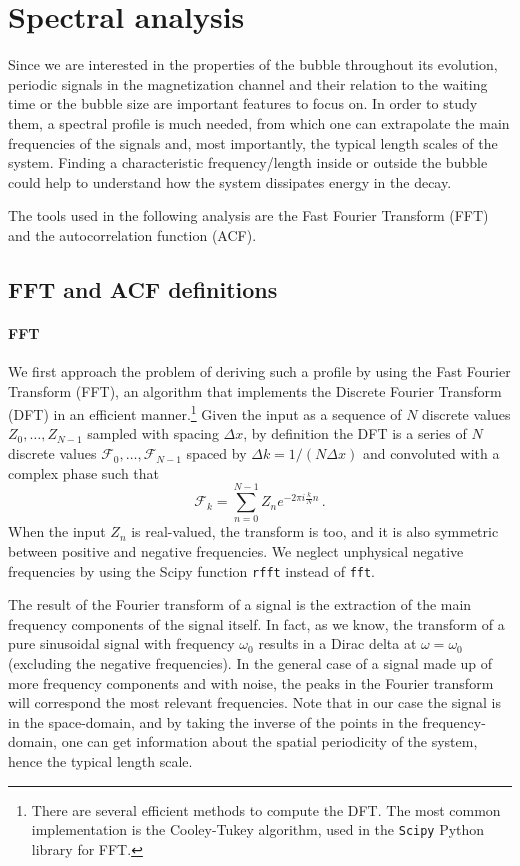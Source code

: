\section{Spectral analysis}
Since we are interested in the properties of the bubble throughout its evolution, periodic signals in the magnetization channel and their relation to the waiting time or the bubble size are important features to focus on. In order to study them, a spectral profile is much needed, from which one can extrapolate the main frequencies of the signals and, most importantly, the typical length scales of the system.
Finding a characteristic frequency/length inside or outside the bubble could help to understand how the system dissipates energy in the decay.

The tools used in the following analysis are the Fast Fourier Transform (FFT) and the autocorrelation function (ACF).

\subsection{FFT and ACF definitions}
\paragraph{FFT}
We first approach the problem of deriving such a profile by using the Fast Fourier Transform (FFT), an algorithm that implements the Discrete Fourier Transform (DFT) in an efficient manner.\footnote{There are several efficient methods to compute the DFT. The most common implementation is the Cooley-Tukey algorithm, used in the \texttt{Scipy} Python library for FFT.} Given the input as a sequence of $N$ discrete values $Z_0,\dots,Z_{N-1}$ sampled with spacing $\Delta x$, by definition the DFT is a series of $N$ discrete values $\mathcal{F}_0,\dots,\mathcal{F}_{N-1}$ spaced by $\Delta k = 1/(N\Delta x)$ and convoluted with a complex phase such that
\begin{equation*}
    \mathcal{F}_k = \sum_{n=0}^{N-1} Z_n e^{-2\pi i \frac{k}{N}n}\, .
\end{equation*}
When the input $Z_n$ is real-valued, the transform is too, and it is also symmetric between positive and negative frequencies. We neglect unphysical negative frequencies by using the Scipy function \texttt{rfft} instead of \texttt{fft}.

The result of the Fourier transform of a signal is the extraction of the main frequency components of the signal itself. In fact, as we know, the transform of a pure sinusoidal signal with frequency $\omega_0$ results in a Dirac delta at $\omega = \omega_0$ (excluding the negative frequencies). In the general case of a signal made up of more frequency components and with noise, the peaks in the Fourier transform will correspond the most relevant frequencies. Note that in our case the signal is in the space-domain, and by taking the inverse of the points in the frequency-domain, one can get information about the spatial periodicity of the system, hence the typical length scale.

